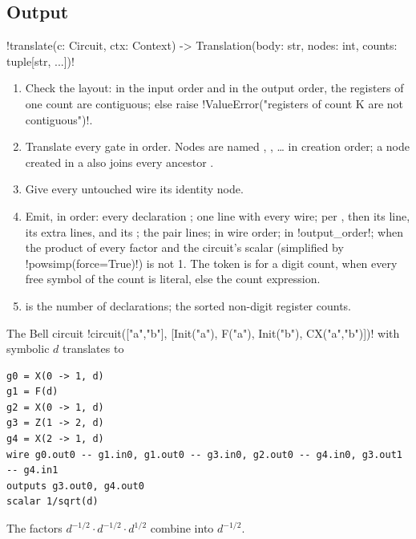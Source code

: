 \subsection{Output}

\begin{signature}
\py!translate(c: Circuit, ctx: Context) -> Translation(body: str, nodes: int, counts: tuple[str, ...])!
\end{signature}

\begin{algorithm}\label{alg:bench-translate}
\begin{enumerate}
\item Check the layout: in the input order and in the output order, the registers of one count
  are contiguous; else raise \py!ValueError("registers of count K are not contiguous")!.
\item Translate every gate in order. Nodes are named , , \dots{} in creation
  order; a node created in a \bbox{} also joins every ancestor \bbox.
\item Give every untouched wire its identity node.
\item Emit, in order: every declaration ; one line  with
  every wire; per \bbox{} , then its
   line, its extra lines, and its ; the pair lines;  in wire order;  in \py!output_order!;  when the
  product of every factor and the circuit's scalar (simplified by \py!powsimp(force=True)!)
  is not 1. The \bbox{} token is  for a digit count,  when every
  free symbol of the count is literal, else the count expression.
\item {} is the number of declarations;  the sorted non-digit register
  counts.
\end{enumerate}
\end{algorithm}

\begin{example}
The Bell circuit \py!circuit(["a","b"], [Init("a"), F("a"), Init("b"), CX("a","b")])! with
symbolic $d$ translates to
\begin{lstlisting}[style=azx]
g0 = X(0 -> 1, d)
g1 = F(d)
g2 = X(0 -> 1, d)
g3 = Z(1 -> 2, d)
g4 = X(2 -> 1, d)
wire g0.out0 -- g1.in0, g1.out0 -- g3.in0, g2.out0 -- g4.in0, g3.out1 -- g4.in1
outputs g3.out0, g4.out0
scalar 1/sqrt(d)
\end{lstlisting}
The factors $d^{-1/2}\cdot d^{-1/2}\cdot d^{1/2}$ combine into $d^{-1/2}$.
\end{example}

